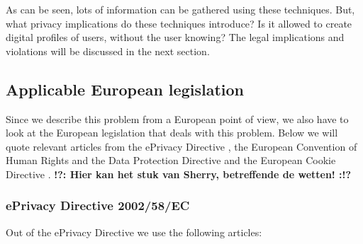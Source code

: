 \documentclass[11pt]{article}
\newcommand{\tocheck}[1]{{\bf !?: #1 :!?}}
\newcommand{\ePD}{ePrivacy Directive }
\newcommand{\DPD}{Data Protection Directive }
\begin{document}
As can be seen, lots of information can be gathered using these techniques. But, what privacy implications do these techniques introduce? Is it allowed to create digital profiles of users, without the user knowing? The legal implications and violations will be discussed in the next section.


\subsection{Applicable European legislation}
Since we describe this problem from a European point of view, we also have to look at the European legislation that deals with this problem. Below we will quote relevant articles from the \ePD, the European Convention of Human Rights and the \DPD and the European Cookie Directive \cite{cookielaw}.
\tocheck{Hier kan het stuk van Sherry, betreffende de wetten!}


\subsubsection{\ePD 2002/58/EC}

Out of the \ePD we use the following articles:
\end{document}
